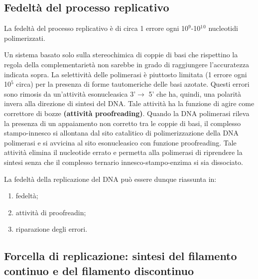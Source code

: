 \documentclass[11pt]{book}
\begin{document}
\subsection{Fedeltà del processo
replicativo}\label{fedeltuxe0-del-processo-replicativo}

La fedeltà del processo replicativo è di circa 1 errore ogni
10\(^9\)-10\(^1\)\(^0\) nucleotidi polimerizzati.

Un sistema basato solo sulla stereochimica di coppie di basi che
rispettino la regola della complementarietà non sarebbe in grado di
raggiungere l'accuratezza indicata sopra. La selettività delle
polimerasi è piuttosto limitata (1 errore ogni 10\(^5\) circa) per la
presenza di forme tautomeriche delle basi azotate. Questi errori sono
rimosis da un'attività esonucleasica 3'\(\rightarrow\) 5' che ha,
quindi, una polarità invera alla direzione di sintesi del DNA. Tale
attività ha la funzione di agire come correttore di bozze
\textbf{(attività proofreading)}. Quando la DNA polimerasi rileva la
presenza di un appaiamento non corretto tra le coppie di basi, il
complesso stampo-innesco si allontana dal sito catalitico di
polimerizzazione della DNA polimerasi e si avvicina al sito
esonucleasico con funzione proofreading. Tale attività elimina il
nucleotide errato e permetta alla polimerasi di riprendere la sintesi
senza che il complesso ternario innesco-stampo-enzima si sia dissociato.

La fedeltà della replicazione del DNA può essere dunque riassunta in:

\begin{enumerate}
\def\labelenumi{\arabic{enumi}.}
\itemsep1pt\parskip0pt
\item
  fedeltà;
\item
  attività di proofreadin;
\item
  riparazione degli errori.
\end{enumerate}

\subsection{Forcella di replicazione: sintesi del filamento continuo e
del filamento
discontinuo}\label{forcella-di-replicazione-sintesi-del-filamento-continuo-e-del-filamento-discontinuo}
\end{document}
